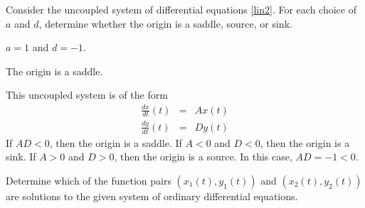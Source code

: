 \documentclass{article}
\begin{document}



\problemlabel

\noindent Consider the uncoupled system of differential equations \eqref{lin2}. For each choice of $a$ and $d$, determine whether the origin is a saddle, source, or sink.

\begin{exercise} \label{E:uncoupleda}
$a=1$ and $d=-1$.

\begin{solution}

\ans The origin is a saddle.

\soln This uncoupled system is of the form
\[
\begin{array}{rcl}
\frac{dx}{dt}(t) & = & Ax(t) \\
\frac{dy}{dt}(t) & = & Dy(t)\end{array}
\]
If $AD < 0$, then the origin is a saddle.  If $A < 0$ and
$D < 0$, then the origin is a sink.  If $A > 0$ and $D > 0$, then
the origin is a source.  In this case, $AD = -1 < 0$.

\end{solution}
\end{exercise}



 

\problemlabel

\noindent Determine which of the function pairs $(x_1(t),y_1(t))$ and $(x_2(t),y_2(t))$ are solutions to the given system of ordinary differential equations.
\end{document}
